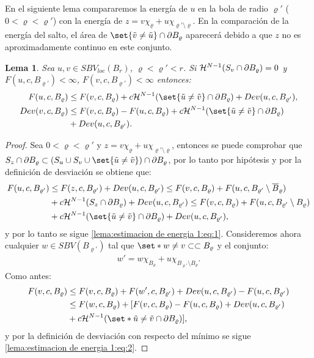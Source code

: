 \documentclass[a4paper,11pt,spanish, twoside, leqno]{tfm-uam}
\newtheorem{lema}[teo]{Lema}
\begin{document}
En el siguiente lema compararemos la energía de $u$ en la bola de radio $\varrho'$ ($0<\varrho<\varrho'$) con la energía de $z=v\chi_{\varrho}+u\chi_{\varrho'\setminus \varrho}$. En la comparación de la energía del salto, el área de $\set{\tilde{v}\not =\tilde{u}}\cap \partial B_{\varrho}$ aparecerá debido a que $z$ no es aproximadamente continuo en este conjunto.
\begin{lema}\label{lema:estimacion de energia 1}
Sea $u,v\in SBV_{loc}(B_{r})$, $\varrho<\varrho'<r$. Si $\mathcal{H}^{N-1}(S_{v}\cap \partial B_{\varrho})=0$ y $F(u,c, B_{\varrho'})<\infty$, $F(v,c, B_{\varrho'})<\infty$ entonces:
\begin{align}
F(u,c,B_{\varrho})&\leq F(v,c,B_{\varrho})+c\Hm{N-1}(\set{\tilde{u}\not =\tilde{v}}\cap \partial B_{\varrho})+Dev(u,c, B_{\varrho'}),\label{lema:estimacion de energia 1:eq:1}\\
Dev(v,c,B_{\varrho})&\leq F(v, c, B_{\varrho})-F(u, c, B_{\varrho})+c\Hm{N-1}(\set{\tilde{u}\not = \tilde{v}}\cap \partial B_{\varrho})\label{lema:estimacion de energia 1:eq:2}\\
&+Dev(u, c, B_{\varrho'}).\nonumber
\end{align}
\end{lema}
\begin{proof}
Sea $0<\varrho<\varrho'$ y $z=v\chi_{\varrho}+u\chi_{\varrho'\setminus \varrho}$, entonces se puede comprobar que $S_{z}\cap \partial B_{\varrho}\subset (S_{u}\cup S_{v}\cup\set{\tilde{u}\not =\tilde{v}})\cap \partial B_{\varrho}$, por lo tanto por hipótesis y por la definición de desviación se obtiene que:
\begin{align*}
F(u,c, B_{\varrho'})&\leq F(z,c,B_{\varrho'})+Dev(u,c,B_{\varrho'})\leq F(v, c,B_{\varrho})+F(u,c, B_{\varrho'}\setminus \overline{B}_{\varrho})
\\&+c\Hm{N-1}(S_{z}\cap \partial B_{\varrho})+Dev(u,c,B_{\varrho'})\leq F(v,c,B_{\varrho})+F(u,c,B_{\varrho'}\setminus B_{\varrho})
\\&+c\Hm{N-1}(\set{\tilde{u}\not = \tilde{v}}\cap \partial B_{\varrho})+Dev(u,c,B_{\varrho'}),
\end{align*}
y por lo tanto se sigue \ref{lema:estimacion de energia 1:eq:1}. Consideremos ahora cualquier $w\in SBV(B_{\varrho'})$ tal que $\set*{w\not = v}\subset\subset B_{\varrho}$ y el conjunto:
\begin{align*}
w'=w\chi_{B_{\varrho}}+u\chi_{B_{\varrho'}\setminus B_{\varrho}}.
\end{align*}
Como antes:
\begin{align*}
F(v, c, B_{\varrho})&\leq F(v, c, B_{\varrho})+F(w', c, B_{\varrho'})+Dev(u,c,B_{\varrho'})-F(u,c,B_{\varrho'})
\\&\leq F(w, c, B_{\varrho})+[F(v, c, B_{\varrho})-F(u,c,B_{\varrho})+Dev(u,c,B_{\varrho'})\\&+c\Hm{N-1}(\set*{\tilde{u}\not=\tilde{v}}\cap \partial B_{\varrho})],
\end{align*}
y por la definición de desviación con respecto del mínimo se sigue \ref{lema:estimacion de energia 1:eq:2}.
\end{proof}
\end{document}
